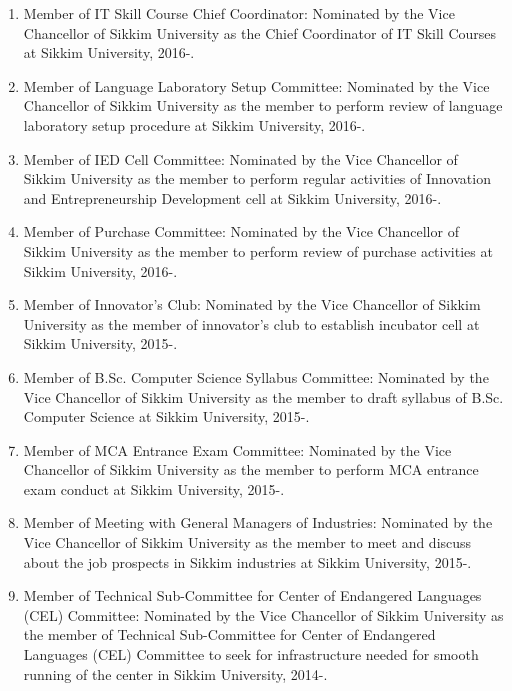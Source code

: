 \documentclass[11pt,a4paper]{moderncv}
\begin{document}
\begin{adjustwidth}{6em}{0pt}
\begin{enumerate}
		\item Member of IT Skill Course Chief Coordinator: Nominated by the Vice Chancellor of Sikkim University as the Chief Coordinator of IT Skill Courses at Sikkim University, 2016-.
		
		\item Member of Language Laboratory Setup Committee: Nominated by the Vice Chancellor of Sikkim University as the member to perform review of language laboratory setup procedure at Sikkim University, 2016-.
		
		\item Member of IED Cell Committee: Nominated by the Vice Chancellor of Sikkim University as the member to perform regular activities of Innovation and Entrepreneurship Development cell at Sikkim University, 2016-.
		
		\item Member of Purchase Committee: Nominated by the Vice Chancellor of Sikkim University as the member to perform review of purchase activities at Sikkim University, 2016-.
		
		\item Member of Innovator's Club: Nominated by the Vice Chancellor of Sikkim University as the member of innovator's club to establish incubator cell at Sikkim University, 2015-.
		
		\item Member of B.Sc. Computer Science Syllabus Committee: Nominated by the Vice Chancellor of Sikkim University as the member to draft syllabus of B.Sc. Computer Science at Sikkim University, 2015-.
		
		\item Member of MCA Entrance Exam Committee: Nominated by the Vice Chancellor of Sikkim University as the member to perform MCA entrance exam conduct at Sikkim University, 2015-.
		
		\item Member of Meeting with General Managers of Industries: Nominated by the Vice Chancellor of Sikkim University as the member to meet and discuss about the job prospects in Sikkim industries at Sikkim University, 2015-.
		
		\item Member of Technical Sub-Committee for Center of Endangered Languages (CEL) Committee: Nominated by the Vice Chancellor of Sikkim University as the member of Technical Sub-Committee for Center of Endangered Languages (CEL) Committee to seek for infrastructure needed for smooth running of the center in Sikkim University, 2014-.
		

\end{enumerate}
\end{adjustwidth}
\end{document}
